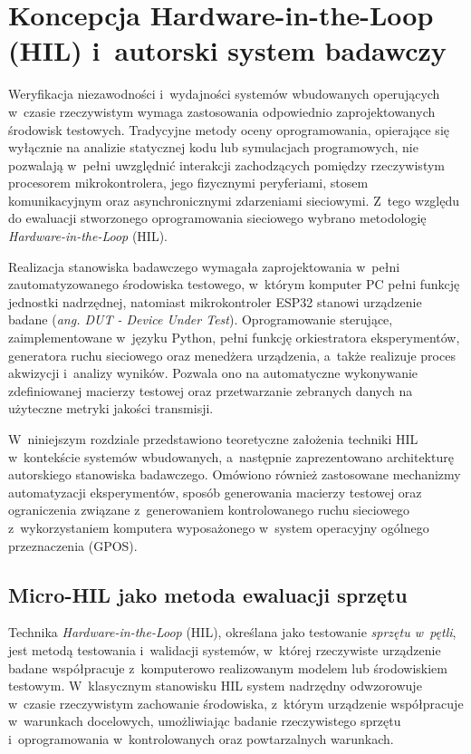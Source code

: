 \chapter{Koncepcja Hardware-in-the-Loop (HIL) i~autorski system badawczy}
\label{chap:hil}

Weryfikacja niezawodności i~wydajności systemów wbudowanych operujących w~czasie rzeczywistym wymaga zastosowania odpowiednio zaprojektowanych środowisk testowych.
Tradycyjne metody oceny oprogramowania, opierające się wyłącznie na analizie statycznej kodu lub symulacjach programowych, nie pozwalają w~pełni uwzględnić interakcji zachodzących pomiędzy rzeczywistym procesorem mikrokontrolera, jego fizycznymi peryferiami, stosem komunikacyjnym oraz asynchronicznymi zdarzeniami sieciowymi.
Z~tego względu do ewaluacji stworzonego oprogramowania sieciowego wybrano metodologię \textit{Hardware-in-the-Loop} (HIL).

Realizacja stanowiska badawczego wymagała zaprojektowania w~pełni zautomatyzowanego środowiska testowego, w~którym komputer PC pełni funkcję jednostki nadrzędnej, natomiast mikrokontroler ESP32 stanowi urządzenie badane (\textit{ang. DUT - Device Under Test}).
Oprogramowanie sterujące, zaimplementowane w~języku Python, pełni funkcję orkiestratora eksperymentów, generatora ruchu sieciowego oraz menedżera urządzenia, a~także realizuje proces akwizycji i~analizy wyników.
Pozwala ono na automatyczne wykonywanie zdefiniowanej macierzy testowej oraz przetwarzanie zebranych danych na użyteczne metryki jakości transmisji.

W~niniejszym rozdziale przedstawiono teoretyczne założenia techniki HIL w~kontekście systemów wbudowanych, a~następnie zaprezentowano architekturę autorskiego stanowiska badawczego.
Omówiono również zastosowane mechanizmy automatyzacji eksperymentów, sposób generowania macierzy testowej oraz ograniczenia związane z~generowaniem kontrolowanego ruchu sieciowego z~wykorzystaniem komputera wyposażonego w~system operacyjny ogólnego przeznaczenia (GPOS).

\section{Micro-HIL jako metoda ewaluacji sprzętu}

Technika \textit{Hardware-in-the-Loop} (HIL), określana jako testowanie \textit{sprzętu w~pętli}, jest metodą testowania i~walidacji systemów, w~której rzeczywiste urządzenie badane współpracuje z~komputerowo realizowanym modelem lub środowiskiem testowym.
W~klasycznym stanowisku HIL system nadrzędny odwzorowuje w~czasie rzeczywistym zachowanie środowiska, z~którym urządzenie współpracuje w~warunkach docelowych, umożliwiając badanie rzeczywistego sprzętu i~oprogramowania w~kontrolowanych oraz powtarzalnych warunkach.

